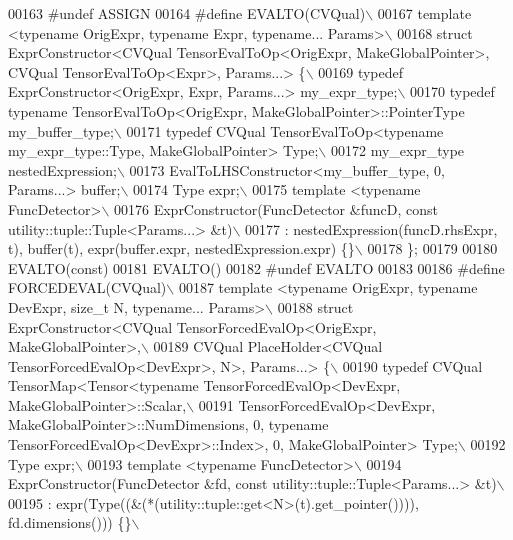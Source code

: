 \begin{DoxyCode}
00163  \textcolor{preprocessor}{#undef ASSIGN}
00164 \textcolor{preprocessor}{#define EVALTO(CVQual)\(\backslash\)}
00167 \textcolor{preprocessor}{template <typename OrigExpr, typename Expr, typename... Params>\(\backslash\)}
00168 \textcolor{preprocessor}{struct ExprConstructor<CVQual TensorEvalToOp<OrigExpr, MakeGlobalPointer>, CVQual TensorEvalToOp<Expr>,
       Params...> \{\(\backslash\)}
00169 \textcolor{preprocessor}{  typedef ExprConstructor<OrigExpr, Expr, Params...> my\_expr\_type;\(\backslash\)}
00170 \textcolor{preprocessor}{  typedef typename TensorEvalToOp<OrigExpr, MakeGlobalPointer>::PointerType my\_buffer\_type;\(\backslash\)}
00171 \textcolor{preprocessor}{  typedef CVQual TensorEvalToOp<typename my\_expr\_type::Type, MakeGlobalPointer> Type;\(\backslash\)}
00172 \textcolor{preprocessor}{  my\_expr\_type nestedExpression;\(\backslash\)}
00173 \textcolor{preprocessor}{  EvalToLHSConstructor<my\_buffer\_type, 0, Params...> buffer;\(\backslash\)}
00174 \textcolor{preprocessor}{  Type expr;\(\backslash\)}
00175 \textcolor{preprocessor}{  template <typename FuncDetector>\(\backslash\)}
00176 \textcolor{preprocessor}{  ExprConstructor(FuncDetector &funcD, const utility::tuple::Tuple<Params...> &t)\(\backslash\)}
00177 \textcolor{preprocessor}{  : nestedExpression(funcD.rhsExpr, t), buffer(t), expr(buffer.expr, nestedExpression.expr) \{\}\(\backslash\)}
00178 \textcolor{preprocessor}{\};}
00179 
00180 EVALTO(\textcolor{keyword}{const})
00181 EVALTO()
00182 \textcolor{preprocessor}{#undef EVALTO}
00183 
00186 \textcolor{preprocessor}{#define FORCEDEVAL(CVQual)\(\backslash\)}
00187 \textcolor{preprocessor}{template <typename OrigExpr, typename DevExpr, size\_t N, typename... Params>\(\backslash\)}
00188 \textcolor{preprocessor}{struct ExprConstructor<CVQual TensorForcedEvalOp<OrigExpr, MakeGlobalPointer>,\(\backslash\)}
00189 \textcolor{preprocessor}{CVQual PlaceHolder<CVQual TensorForcedEvalOp<DevExpr>, N>, Params...> \{\(\backslash\)}
00190 \textcolor{preprocessor}{  typedef CVQual TensorMap<Tensor<typename TensorForcedEvalOp<DevExpr, MakeGlobalPointer>::Scalar,\(\backslash\)}
00191 \textcolor{preprocessor}{  TensorForcedEvalOp<DevExpr, MakeGlobalPointer>::NumDimensions, 0, typename
       TensorForcedEvalOp<DevExpr>::Index>, 0, MakeGlobalPointer> Type;\(\backslash\)}
00192 \textcolor{preprocessor}{  Type expr;\(\backslash\)}
00193 \textcolor{preprocessor}{  template <typename FuncDetector>\(\backslash\)}
00194 \textcolor{preprocessor}{  ExprConstructor(FuncDetector &fd, const utility::tuple::Tuple<Params...> &t)\(\backslash\)}
00195 \textcolor{preprocessor}{  : expr(Type((&(*(utility::tuple::get<N>(t).get\_pointer()))), fd.dimensions())) \{\}\(\backslash\)}

\end{DoxyCode}

